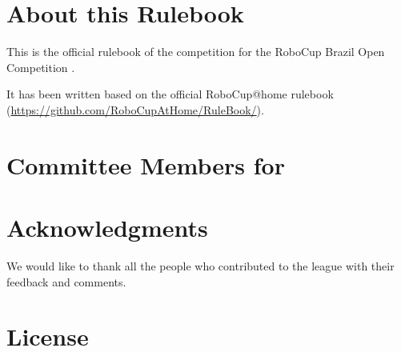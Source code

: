 

\section*{About this Rulebook}  
This is the official rulebook of the \AtHome{} competition for the RoboCup Brazil Open Competition \YEAR.

It has been written based on the official RoboCup@home rulebook (\url{https://github.com/RoboCupAtHome/RuleBook/}). 

\section*{Committee Members for \YEAR}


\section*{Acknowledgments}
\label{sec:acknowledgments}

We would like to thank all the people who contributed to the \AtHome{} league with their feedback and comments.

\vfill

\section*{License}

\doclicenseThis

